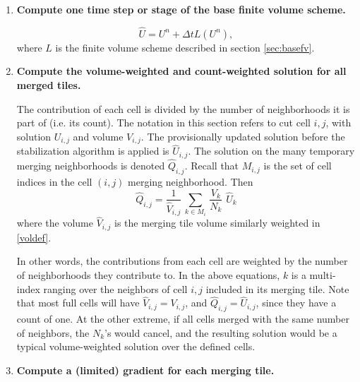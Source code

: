 \begin{enumerate}
\item
{\bf Compute one time step or stage of the base finite volume scheme.}  

$$
\widehat{U} = U^n + \Delta t L(U^n),
$$
where $L$ is the finite volume scheme described in section \ref{sec:basefv}.
\item
{\bf Compute the volume-weighted and count-weighted solution for all
merged tiles.}   

\vspace*{.1in}
The contribution of each cell is divided by the number of neighborhoods 
it is part of (i.e. its count). The notation in this section refers
to cut cell $i,j$, with solution $U_{i,j}$ and volume
$V_{i,j}$. 
The provisionally updated solution before the
stabilization algorithm is applied is $\widehat{U}_{i,j}$.
The solution on the many temporary merging neighborhoods 
is denoted  $\widehat{Q}_{i,j}$. 
Recall that $M_{i,j}$ is the set of cell indices in the cell $(i,j)$ merging
neighborhood.  Then
\begin{equation}
\label{tiledef}
\widehat{Q}_{i,j} =  \frac{1}{{\widehat V}_{i,j}} \, \sum_{k \in M_i} \,  
\frac{V_k}{N_k}  \,\,  \widehat{U}_k
\end{equation}
where the volume ${\widehat V}_{i,j}$ is the merging tile volume similarly weighted in \eqref{voldef}.


In other words, the contributions from each cell are weighted by the
number of neighborhoods they contribute to.
In the above equations, $k$ is  a multi-index ranging over the neighbors 
of cell $i,j$ included in its merging tile.
Note that most full cells will have ${\widehat V}_{i,j} = V_{i,j}$, 
and $\widehat{Q}_{i,j}  = \widehat{U}_{i,j}$, since they have a count of one.
At the other extreme, if all cells merged with the same number of neighbors, the $N_k$'s
would cancel, and the resulting solution would be a typical volume-weighted
solution over the defined cells.

\item
{\bf Compute a (limited) gradient for each merging
tile.}


\end{enumerate}
